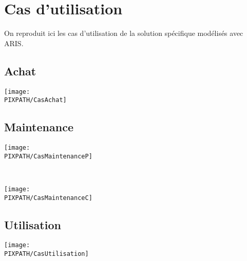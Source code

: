 \section{Cas d'utilisation}

On reproduit ici les cas d'utilisation de la solution spécifique modélisés
avec ARIS.

\subsection{Achat}

\begin{center}
\texttt{[image: \\PIXPATH/CasAchat]}
\end{center}

\subsection{Maintenance}

\begin{center}
\texttt{[image: \\PIXPATH/CasMaintenanceP]}
\end{center}

\hfill\\

\begin{center}
\texttt{[image: \\PIXPATH/CasMaintenanceC]}
\end{center}

\subsection{Utilisation}

\begin{center}
\texttt{[image: \\PIXPATH/CasUtilisation]}
\end{center}
